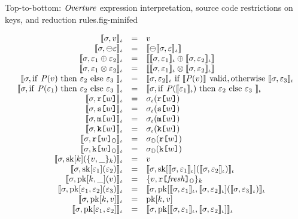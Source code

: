 \begin{fpfig}[t]{Top-to-bottom: $\minifed$ expression interpretation, source code restrictions on keys, and reduction rules.}{fig-minifed}
{  $$
  \begin{array}{rcl}
    \lcod{\store, v}{\cid} &=& v\\
    \lcod{\store, \ominus \be}{\cid} & = &  \fcod{\ominus \lcod{\store, \be}{\cid}}\\ 
    \lcod{\store, \be_1 \oplus \be_2}{\cid} &=& \fcod{\lcod{\store, \be_1}{\cid} \oplus \lcod{\store, \be_2}{\cid}}\\ 
    \lcod{\store, \be_1 \otimes \be_2}{\cid} &=& \fcod{\lcod{\store, \be_1}{\cid} \otimes \lcod{\store, \be_2}{\cid}}\\
    \lcod{\store, \eite{\fp(v)}{\be_2}{\be_3}}{\cid} &=&
      \lcod{\store, \be_2}{\cid}\ \text{if}\ \fcod{\fp(v)}\ \text{valid}, 
      \text{otherwise}\ \lcod{\store, \be_3}{\cid}\\
    \lcod{\store, \eite{\fp(\be_1)}{\be_2}{\be_3}}{\cid} &=& \lcod{\store, \eite{\fp(\lcod{\be_1}{\cid})}{\be_2}{\be_3}}{\cid}\\
    \lcod{\store, \flip{w}}{\cid} &=& \store_\cid(\flip{w})\\
    \lcod{\store, \secret{w}}{\cid} &=& \store_\cid(\secret{w})\\
    \lcod{\store, \mesg{w}}{\cid} &=& \store_\cid(\mesg{w})\\
    \lcod{\store, \key{w}}{\cid}  &=&  \store_\cid(\key{w})\\
    \lcod{\store, \elab{\flip{w}}{\Oracle}}{\cid} &=& \store_\Oracle(\flip{w})\\
    \lcod{\store, \elab{\key{w}}{\Oracle}}{\cid} &=& \store_\Oracle(\key{w})\\
    \lcod{\store, \sk{k}(\ctxt{v,\_}{k})}{\cid} &=& v\\
    \lcod{\store, \sk{\be_1}(\be_2)}{\cid} &=& \lcod{\store, \sk{\lcod{\store,\be_1}{\cid}}(\lcod{\store, \be_2}{\cid})}{\cid}\\
    \lcod{\store, \pk{k}{\_}(v)}{\cid} &=& \ctxt{v,\elab{\flip{\mathit{fresh}}}{\Oracle}}{k}\\
    \lcod{\store, \pk{\be_1}{\be_2}(\be_3)}{\cid} &=&  
       \lcod{\store, \pk{\lcod{\store,\be_1}{\cid}}{\lcod{\store, \be_2}{\cid}}(\lcod{\store, \be_3}{\cid})}{\cid}\\
    \lcod{\store, \pk{k}{v}}{\cid} &=& \pk{k}{v}\\
    \lcod{\store, \pk{\be_1}{\be_2}}{\cid} &=& \lcod{\store, \pk{\lcod{\store,\be_1}{\cid}}{\lcod{\store, \be_2}{\cid}}}{\cid}
  \end{array} 
  $$

}
\end{fpfig}
